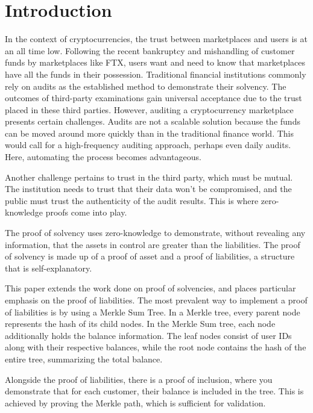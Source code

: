 
\chapter{Introduction}

In the context of cryptocurrencies, the trust between marketplaces and users is at an all time low. Following the recent bankruptcy and mishandling of customer funds by marketplaces like FTX, users want and need to know that marketplaces have all the funds in their possession. 
Traditional financial institutions commonly rely on audits as the established method to demonstrate their solvency. The outcomes of third-party examinations gain universal acceptance due to the trust placed in these third parties. However, auditing a cryptocurrency marketplace presents certain challenges. 
Audits are not a scalable solution because the funds can be moved around more quickly than in the traditional finance world. This would call for a high-frequency auditing approach, perhaps even daily audits. Here, automating the process becomes advantageous.

Another challenge pertains to trust in the third party, which must be mutual. The institution needs to trust that their data won't be compromised, and the public must trust the authenticity of the audit results. This is where zero-knowledge proofs come into play. 

The proof of solvency uses zero-knowledge to demonstrate, without revealing any information, that the assets in control are greater than the liabilities. The proof of solvency is made up of a proof of asset and a proof of liabilities, a structure that is self-explanatory.

This paper extends the work done on proof of solvencies, and places particular emphasis on the proof of liabilities. The most prevalent way to implement a proof of liabilities is by using a Merkle Sum Tree. 
In a Merkle tree, every parent node represents the hash of its child nodes. In the Merkle Sum tree, each node additionally holds the balance information. The leaf nodes consist of user IDs along with their respective balances, while the root node contains the hash of the entire tree, summarizing the total balance.

 Alongside the proof of liabilities, there is a proof of inclusion, where you demonstrate that for each customer, their balance is included in the tree. This is achieved by proving the Merkle path, which is sufficient for validation.

